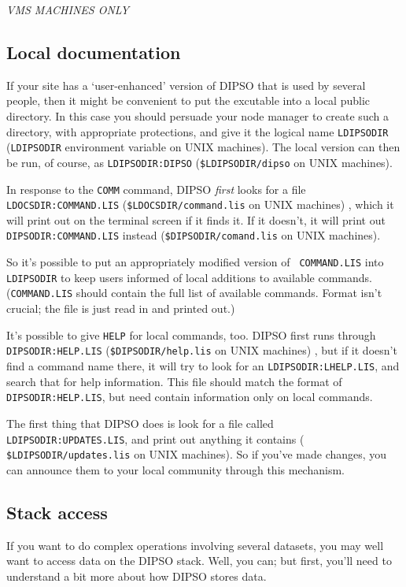 {\em VMS MACHINES ONLY}

\subsection {Local documentation}

If your site has a `user-enhanced' version of DIPSO that is used by
several people, then it might be convenient to put the excutable  into
a local public directory.   In this case you should persuade your node
manager to create such a directory, with appropriate protections, and
give it the logical name {\tt LDIPSODIR} ({\tt LDIPSODIR} environment
variable on UNIX machines). The local version can then be run, of
course, as {\tt LDIPSODIR:DIPSO} ({\tt \$LDIPSODIR/dipso} on UNIX
machines).

In response to the {\tt COMM} command, DIPSO {\em first} looks for a
file {\tt LDOCSDIR:\-COMMAND\-.LIS} ({\tt \$LDOCS\-DIR/command\-.lis} on UNIX
machines) , which it will print out on the terminal screen if it finds
it. If it doesn't, it will print out {\tt DIPSODIR:\-COMMAND\-.LIS}
instead ({\tt \$DIPSODIR/comand\-.lis} on UNIX machines).

So it's possible to put an appropriately modified version of {\tt
COMMAND.LIS} into {\tt LDIPSODIR} to keep users informed of local
additions to available commands. ({\tt COMMAND.LIS} should contain the
full list of available commands. Format isn't crucial; the file is
just read in and printed out.)

It's possible to give {\tt HELP} for local commands, too. DIPSO first
runs through {\tt DIPSODIR:\-HELP.LIS} ({\tt \$DIPSODIR/help.lis} on
UNIX machines) , but if it doesn't find a command name there, it will
try to look for an {\tt LDIPSODIR:LHELP.LIS}, and search that for help
information. This file should match the format of {\tt
DIPSODIR:HELP.LIS}, but need contain information only on local
commands.

The first thing that DIPSO does is look for a file called {\tt
LDIPSODIR:UPDATES.LIS}, and print out anything it contains ({\tt
\$LDIPSODIR/updates.lis} on UNIX machines). So if you've made changes,
you can announce them to your local community through this mechanism.

\subsection {Stack access}

If you want to do complex operations involving several datasets, you
may well want to access data on the DIPSO stack. Well, you can; but
first, you'll need to understand a bit more about how DIPSO stores
data.

